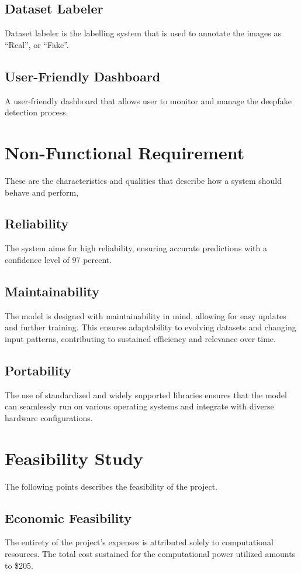     \subsection{Dataset Labeler}
        Dataset labeler is the labelling system that is used to annotate the images as “Real”, or “Fake”.

    \subsection{User-Friendly Dashboard}
        A user-friendly dashboard that allows user to monitor and manage the deepfake detection process.

\section{Non-Functional Requirement}
    These are the characteristics and qualities that describe how a system should behave and perform,

    \subsection{Reliability}
        The system aims for high reliability, ensuring accurate predictions with a confidence level of 97 percent.
    \subsection{Maintainability}
        The model is designed with maintainability in mind, allowing for easy updates and further training. This ensures adaptability to evolving datasets and changing input patterns, contributing to sustained efficiency and relevance over time.
    \subsection{Portability}
        The use of standardized and widely supported libraries ensures that the model can seamlessly run on various operating systems and integrate with diverse hardware configurations.
    
\newpage
\section{Feasibility Study}
    The following points describes the feasibility of the project.

    \subsection{Economic Feasibility}
        The entirety of the project's expenses is attributed solely to computational resources. The total cost sustained for the computational power utilized amounts to \$205.

